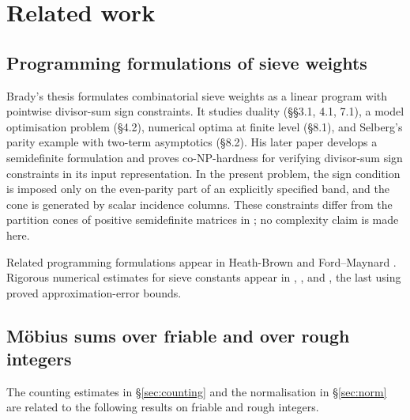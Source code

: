 \documentclass[11pt,a4paper]{article}
\theoremstyle{plain}
\theoremstyle{definition}
\theoremstyle{remark}
\begin{document}
\section{Related work}\label{sec:prior}

\subsection{Programming formulations of sieve weights}\label{sec:lp}
Brady's thesis \cite{BradyThesis} formulates combinatorial sieve weights as a linear program with
pointwise divisor-sum sign constraints. It studies duality (\S\S3.1, 4.1, 7.1), a model optimisation
problem (\S4.2), numerical optima at finite level (\S8.1), and Selberg's parity example with two-term
asymptotics (\S8.2). His later paper \cite[\S2, Prop.~1]{BradySDP} develops a semidefinite formulation
and proves co-NP-hardness for verifying divisor-sum sign constraints in its input representation.
In the present problem, the sign condition is imposed only on the even-parity part of an explicitly
specified band, and the cone is generated by scalar incidence columns. These constraints differ
from the partition cones of positive semidefinite matrices in \cite{BradySDP}; no complexity claim
is made here.

Related programming formulations appear in Heath-Brown \cite[\S4]{HeathBrown} and Ford--Maynard
\cite[Thms.~7.3--7.4]{FordMaynard}. Rigorous numerical estimates for sieve constants appear in
\cite[\S7.1]{Polymath}, \cite[\S\S5.1--5.2]{BookerBrowning}, and
\cite[\S\S7--8]{Franze}, the last using proved approximation-error bounds.

\subsection{M\"obius sums over friable and over rough integers}\label{sec:friable}
The counting estimates in \S\ref{sec:counting} and the normalisation in \S\ref{sec:norm}
are related to the following results on friable and rough integers.
\end{document}
